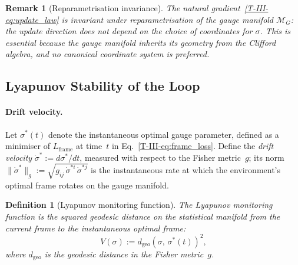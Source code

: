 \documentclass[12pt,a4paper,openany]{book}
\newtheorem{definition}[theorem]{Definition}
\newtheorem{remark}[theorem]{Remark}
\begin{document}
\begin{remark}[Reparametrisation invariance]
\label{T-III-rem:reparam}
The natural gradient~\eqref{T-III-eq:update_law} is invariant
under reparametrisation of the gauge manifold
$\mathcal{M}_G$: the update direction does not depend on the
choice of coordinates for $\sigma$.
This is essential because the gauge manifold inherits its
geometry from the Clifford algebra, and no canonical
coordinate system is preferred.
\end{remark}

\subsection{Lyapunov Stability of the Loop}
\label{T-III-subsec:lyapunov}

\paragraph{Drift velocity.}
Let $\sigma^*(t)$ denote the instantaneous optimal gauge
parameter, defined as a minimiser of $L_{\mathrm{frame}}$
at time~$t$ in Eq.~\eqref{T-III-eq:frame_loss}.
Define the \emph{drift velocity}
$\dot{\sigma}^* := d\sigma^*/dt$, measured with respect to
the Fisher metric~$g$; its norm
$\|\dot{\sigma}^*\|_g
:= \sqrt{g_{ij}\,\dot{\sigma}^{*i}\,\dot{\sigma}^{*j}}$
is the instantaneous rate at which the environment's
optimal frame rotates on the gauge manifold.

\begin{definition}[Lyapunov monitoring function]
\label{T-III-def:lyapunov}
The \emph{Lyapunov monitoring function} is the squared
geodesic distance on the statistical manifold from the
current frame to the instantaneous optimal frame:
\begin{equation}
\label{T-III-eq:lyapunov}
V(\sigma)
:= d_{\mathrm{geo}}\!\left(\sigma,\,\sigma^*(t)\right)^2,
\end{equation}
where $d_{\mathrm{geo}}$ is the geodesic distance in the
Fisher metric~$g$.
\end{definition}
\end{document}
